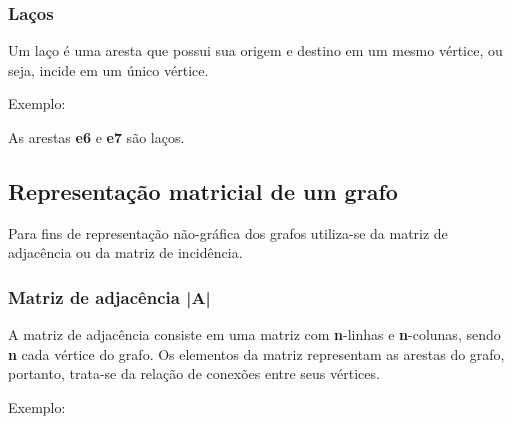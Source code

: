 \documentclass[a4paper, 12pt]{article}
\begin{document}
\subsubsection{Laços}
    Um laço é uma aresta que possui sua origem e destino em um mesmo vértice, ou seja, incide em um único vértice.
    
    \vspace{0.5in}
    
    Exemplo:
    
    \begin{center}
    \end{center}
    
    As arestas \textbf{e6} e \textbf{e7} são laços.

        
\subsection{Representação matricial de um grafo}

    Para fins de representação não-gráfica dos grafos utiliza-se da matriz de adjacência ou da matriz de incidência.
    
\subsubsection{Matriz de adjacência |A|}

    A matriz de adjacência consiste em uma matriz com \textbf{n}-linhas e \textbf{n}-colunas, sendo \textbf{n} cada vértice do grafo. Os elementos da matriz representam as arestas do grafo, portanto, trata-se da relação de conexões entre seus vértices.
    
    \vspace{0.5in}
    
    Exemplo:
    
\end{document}
